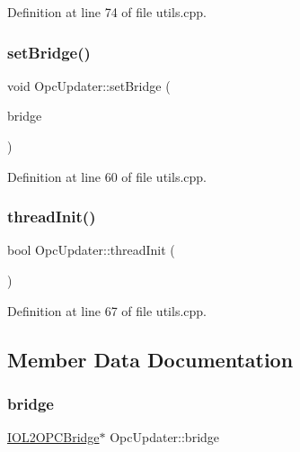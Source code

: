 Definition at line 74 of file utils.\+cpp.

\mbox{\label{classOpcUpdater_ac1143b612eae3f2c8711343a5836c7f1}} 
\subsubsection{\texorpdfstring{set\+Bridge()}{setBridge()}}
{\footnotesize\ttfamily void Opc\+Updater\+::set\+Bridge (\begin{DoxyParamCaption}\item[{\hyperlink{group__iol2opc_classIOL2OPCBridge}{I\+O\+L2\+O\+P\+C\+Bridge} $\ast$}]{bridge }\end{DoxyParamCaption})}



Definition at line 60 of file utils.\+cpp.

\mbox{\label{classOpcUpdater_a4e5af469e9f8ac81d2d1e773afc04c1e}} 
\subsubsection{\texorpdfstring{thread\+Init()}{threadInit()}}
{\footnotesize\ttfamily bool Opc\+Updater\+::thread\+Init (\begin{DoxyParamCaption}{ }\end{DoxyParamCaption})\hspace{0.3cm}{\ttfamily [protected]}}



Definition at line 67 of file utils.\+cpp.



\subsection{Member Data Documentation}
\mbox{\label{classOpcUpdater_a2a19d340c7173501cc60c2a154d80946}} 
\subsubsection{\texorpdfstring{bridge}{bridge}}
{\footnotesize\ttfamily \hyperlink{group__iol2opc_classIOL2OPCBridge}{I\+O\+L2\+O\+P\+C\+Bridge}$\ast$ Opc\+Updater\+::bridge\hspace{0.3cm}{\ttfamily [protected]}}



